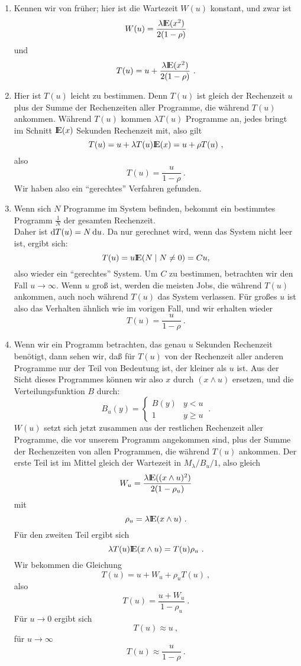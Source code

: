 \begin{enumerate}
\item Kennen wir von früher; hier ist die Wartezeit $W(u)$ konstant, und zwar ist
\[W(u) = \frac{\lambda {\rm I\kern-0.2em E}(x^{2})}{2(1-\rho)} \]
und
\[T(u) = u + \frac{\lambda {\rm I\kern-0.2em E}(x^{2})}{2(1-\rho)} ~.  \]
\item Hier ist $T(u)$ leicht zu bestimmen. Denn $T(u)$ ist gleich der Rechenzeit $u$ plus der Summe der Rechenzeiten aller Programme, die während $T(u)$
ankommen.
Während $T(u)$ kommen $\lambda T(u)$ Programme an, jedes bringt im Schnitt ${\rm I\kern-0.2em E}(x)$ Sekunden Rechenzeit mit, also gilt
\[T(u) = u + \lambda T(u){\rm I\kern-0.2em E}(x)=u + \rho T(u) ~,\]
also
\[T(u)=\frac{u}{1-\rho} ~. \]
Wir haben also ein \enquote{gerechtes} Verfahren gefunden.
\item Wenn sich $N$ Programme im System befinden, bekommt ein bestimmtes Programm $\frac{1}{N}$ der gesamten Rechenzeit. \\
Daher ist $\mathop{}\!\mathrm{d} T(u) = N \mathop{}\!\mathrm{d} u$. Da nur gerechnet wird, wenn das System nicht leer ist, ergibt sich:
\[ T(u)=u{\rm I\kern-0.2em E}(N \mid N \not= 0)=Cu, \]
also wieder ein \enquote{gerechtes} System. Um $C$ zu bestimmen, betrachten wir den Fall $u \rightarrow \infty$. Wenn $u$ groß ist, werden die meisten Jobs, die während
$T(u)$ ankommen, auch noch während $T(u)$ das System verlassen. Für großes $u$ ist also das Verhalten ähnlich wie im vorigen Fall, und wir erhalten wieder
\[T(u)=\frac{u}{1-\rho} ~. \]
\item Wenn wir ein Programm betrachten, das genau $u$ Sekunden Rechenzeit benötigt, dann sehen wir, daß für $T(u)$ von der Rechenzeit aller anderen Programme
nur der Teil von Bedeutung ist, der kleiner als $u$ ist. Aus der Sicht dieses Programmes können wir also $x$ durch $(x \land u)$ ersetzen, und die
Verteilungsfunktion $B$ durch:
\[
B_{u}(y) =  \left\{
\begin{array}{lc}
B(y) & y<u \\
1 & y \geq u
\end{array} \right. ~.
\]
$W(u)$ setzt sich jetzt zusammen aus der restlichen Rechenzeit aller Programme, die vor unserem Programm angekommen sind, plus der Summe der Rechenzeiten von
allen Programmen, die während $T(u)$ ankommen. Der erste Teil ist im Mittel gleich der Wartezeit in $M_{\lambda}/B_{u}/1$, also gleich
\[W_{u}=\frac{\lambda {\rm I\kern-0.2em E}((x \land u)^{2})}{2(1-\rho _{u})}  \]
mit
\[\rho _{u}=\lambda {\rm I\kern-0.2em E}(x \wedge u) ~.\]
Für den zweiten Teil ergibt sich
\[\lambda T(u){\rm I\kern-0.2em E}(x \wedge u) = T(u)\rho _{u} ~.\]
Wir bekommen die Gleichung
\[T(u)=u+W_{u}+\rho _{u}T(u) ~,  \]
also
\[T(u)=\frac{u+W_{u}}{1-\rho_{u}} ~. \]
Für $u \rightarrow 0$ ergibt sich
\[T(u) \approx u ~, \]
für $u \rightarrow \infty$
\[T(u) \approx \frac{u}{1-\rho} ~. \]
\end{enumerate}

